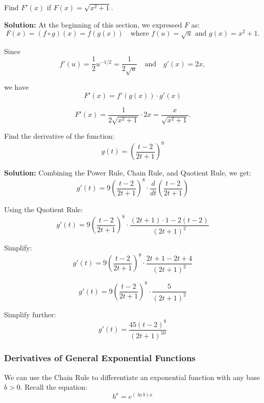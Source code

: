 \documentclass[12pt]{article}
\theoremstyle{beautifulthm}
\begin{document}
\begin{tcolorbox}[colback=examplebg, colframe=red!75!black, title=\textbf{EXAMPLE : Find the Derivative of the function}, fonttitle=\bfseries, sharp corners]

Find \(F'(x)\) if \(F(x) = \sqrt{x^2 + 1}\).

\tcblower
\textbf{Solution:}
At the beginning of this section, we expressed \(F\) as:
\[
F(x) = (f \circ g)(x) = f(g(x)) \quad \text{where } f(u) = \sqrt{u} \text{ and } g(x) = x^2 + 1.
\]

Since
\[
f'(u) = \frac{1}{2} u^{-1/2} = \frac{1}{2\sqrt{u}} \quad \text{and} \quad g'(x) = 2x,
\]

we have
\[
F'(x) = f'(g(x)) \cdot g'(x)
\]

\[
F'(x) = \frac{1}{2\sqrt{x^2 + 1}} \cdot 2x = \frac{x}{\sqrt{x^2 + 1}}.
\]

\end{tcolorbox}

\begin{tcolorbox}[colback=examplebg, colframe=red!75!black, title=\textbf{EXAMPLE 2 : Find the Derivative of the function}, fonttitle=\bfseries, sharp corners]


Find the derivative of the function:
\[
g(t) = \left( \frac{t - 2}{2t + 1} \right)^9
\]

\tcblower
\textbf{Solution:}
Combining the Power Rule, Chain Rule, and Quotient Rule, we get:
\[
g'(t) = 9 \left( \frac{t - 2}{2t + 1} \right)^8 \cdot \frac{d}{dt} \left( \frac{t - 2}{2t + 1} \right)
\]

Using the Quotient Rule:
\[
g'(t) = 9 \left( \frac{t - 2}{2t + 1} \right)^8 \cdot \frac{(2t + 1) \cdot 1 - 2(t - 2)}{(2t + 1)^2}
\]

Simplify:
\[
g'(t) = 9 \left( \frac{t - 2}{2t + 1} \right)^8 \cdot \frac{2t + 1 - 2t + 4}{(2t + 1)^2}
\]

\[
g'(t) = 9 \left( \frac{t - 2}{2t + 1} \right)^8 \cdot \frac{5}{(2t + 1)^2}
\]

Simplify further:
\[
g'(t) = \frac{45(t - 2)^8}{(2t + 1)^{10}}
\]

\end{tcolorbox}

\subsubsection{Derivatives of General Exponential Functions}
We can use the Chain Rule to differentiate an exponential function with any base \(b > 0\). Recall the equation:
\[
b^x = e^{(\ln b)x}
\]
\end{document}
